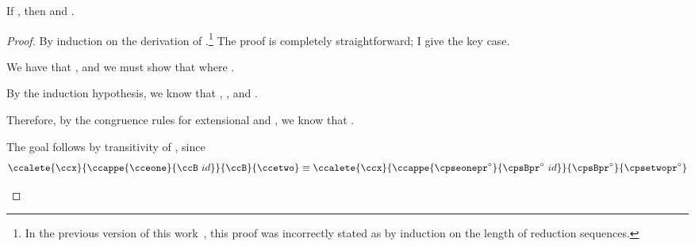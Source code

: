 \begin{lemma}
  \label{lem:cps:red-pres}
  If \im{{\cpseone} \stepstar {\cpsetwo}}, then
  \im{\cpsmodel{\cpseone} \stepstar \ccepr} and \im{\cpsmodel{\cpsetwo} \equiv \ccepr}.
\end{lemma}
\begin{proof}
  By induction on the derivation of \im{\cpseone \stepstar
    \cpsetwo}.\footnote{In the previous version of this
    work~\cite{bowman2018:cps-sigma}, this proof was incorrectly stated as by
    induction on the length of reduction sequences.}
  The proof is completely straightforward; I give the key case.
  \begin{proofcases}
    \item {}

      We have that
      \im{\cpscappe{\cpseone}{\cpsA}{\cpsfune{\cpsx}{\cpsB}{\cpsetwo}} \stepstar
        \cpscappe{\cpseonepr}{\cpsApr}{\cpsfune{\cpsx}{\cpsBpr}{\cpsetwopr}}},
      and we must show that
      \im{\ccalete{\ccx}{\ccappe{\cpsmodel{\cpseone}}{\cpsmodel{\cpsB}~\ccidk}}{\cpsmodel{\cpsB}}{\cpsmodel{\cpsetwo}} \stepstar \ccepr} where \im{\ccepr \equiv
        {\ccalete{\ccx}{\ccappe{\cpsmodel{\cpseonepr}}{\cpsmodel{\cpsBpr}~\ccidk}}{\cpsmodel{\cpsBpr}}{\cpsmodel{\cpsetwopr}}}}.

      By the induction hypothesis, we know that \im{\cpsmodel{\cpseone}
        \stepstar \cceone \equiv \cpsmodel{\cpseonepr}}, \im{\cpsmodel{\cpsB}
        \stepstar \ccB \equiv \cpsmodel{\cpsBpr}}, and \im{\cpsmodel{\cpsetwo}
        \stepstar \ccetwo \equiv \cpsmodel{\cpsetwopr}}.

      Therefore, by the congruence rules for extensional 
       and , we know
      that
      \im{\ccalete{\ccx}{\ccappe{\cpsmodel{\cpseone}}{\cpsmodel{\cpsB}~\ccidk}}{\cpsmodel{\cpsB}}{\cpsmodel{\cpsetwo}} \stepstar
        \ccalete{\ccx}{\ccappe{\cceone}{\ccB~\ccidk}}{\ccB}{\ccetwo}}.

      The goal follows by transitivity of \im{\equiv}, since
      \begin{displaymath}
      \ccalete{\ccx}{\ccappe{\cceone}{\ccB~\ccidk}}{\ccB}{\ccetwo}
\equiv {\ccalete{\ccx}{\ccappe{\cpsmodel{\cpseonepr}}{\cpsmodel{\cpsBpr}~\ccidk}}{\cpsmodel{\cpsBpr}}{\cpsmodel{\cpsetwopr}}}
      \end{displaymath}
  \end{proofcases}
\end{proof}

